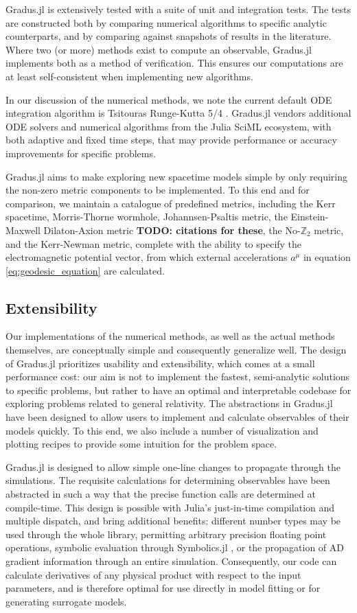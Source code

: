 \documentclass[fleqn,usenatbib]{mnras}
\newcommand{\todo}[1]{{\noindent \bf \color{red} TODO: #1}}
\newcommand{\Gradus}{Gradus.jl\xspace}
\begin{document}
\Gradus is extensively tested with a suite of unit and integration tests. The
tests are constructed both by comparing numerical algorithms to specific
analytic counterparts, and by comparing against snapshots of results in the
literature. Where two (or more) methods exist to compute an observable, \Gradus
implements both as a method of verification. This ensures our computations are
at least self-consistent when implementing new algorithms.

In our discussion of the numerical methods, we note the current default ODE
integration algorithm is Tsitouras Runge-Kutta 5/4
\citep{tsitouras_rungekutta_2011}. \Gradus vendors additional ODE solvers and
numerical algorithms from the Julia SciML ecosystem, with both adaptive and
fixed time steps, that may provide performance or accuracy improvements for
specific problems.

\Gradus aims to make exploring new spacetime models simple by only requiring the
non-zero metric components to be implemented. To this end and for comparison, we
maintain a catalogue of predefined metrics, including the Kerr spacetime,
Morris-Thorne wormhole, Johannsen-Psaltis metric, the Einstein-Maxwell
Dilaton-Axion metric \todo{citations for these}, the No-$\mathbb{Z}_2$ metric, and
the Kerr-Newman metric, complete with the ability to specify the electromagnetic
potential vector, from which external accelerations $a^\mu$ in
equation \eqref{eq:geodesic_equation} are calculated.

\subsection{Extensibility}

Our implementations of the numerical methods, as well as the actual methods
themselves, are conceptually simple and consequently generalize well. The design
of \Gradus prioritizes usability and extensibility, which comes at a small
performance cost: our aim is not to implement the fastest, semi-analytic
solutions to specific problems, but rather to have an optimal and interpretable
codebase for exploring problems related to general relativity. The abstractions
in \Gradus have been designed to allow users to implement and calculate
observables of their models quickly. To this end, we also include a number of
visualization and plotting recipes to provide some intuition for the problem
space.

\Gradus is designed to allow simple one-line changes to propagate through the
simulations. The requisite calculations for determining observables have been
abstracted in such a way that the precise function calls are determined at
compile-time. This design is possible with Julia's just-in-time compilation and
multiple dispatch, and bring additional benefits: different number types may be
used through the whole library, permitting arbitrary precision floating point
operations, symbolic evaluation through Symbolics.jl \citep{symbolics_julia}, or
the propagation of AD gradient information through an entire simulation.
Consequently, our code can calculate derivatives of any physical product with
respect to the input parameters, and is therefore optimal for use directly in
model fitting or for generating surrogate models.
\end{document}
